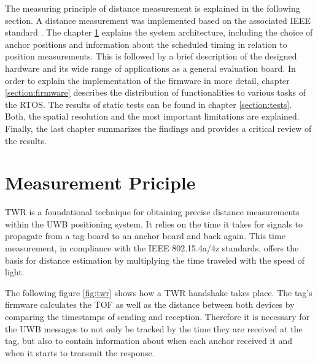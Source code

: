\documentclass[conference, a4paper]{IEEEtran}
\begin{document}
The measuring principle of distance measurement is explained in the following section.
A distance measurement was implemented based on the associated IEEE standard  \cite{IEEE802154a} \cite{IEEE802154z}.
The chapter \ref{Section:principle} explains the system architecture,
including the choice of anchor positions and 
information about the scheduled timing in relation to position measurements.
This is followed by a brief description of the designed hardware and
its wide range of applications as a general evaluation board.
In order to explain the implementation of the firmware in more detail,
chapter \ref{section:firmware} describes the distribution of functionalities to various tasks of the \ac{RTOS}.
The results of static tests can be found in chapter \ref{section:tests}.
Both, the spatial resolution and the most important limitations are explained.
Finally, the last chapter summarizes the findings and provides a critical review of the results.



\section{Measurement Priciple}\label{Section:principle}
\acf{TWR} is a foundational technique for obtaining precise distance measurements within the \ac{UWB} positioning system.
It relies on the time it takes for signals to propagate from a tag board to an anchor board and back again.
This time measurement, in compliance with the IEEE 802.15.4a/4z standards\cite{IEEE802154a}\cite{IEEE802154z}, offers the basis for distance estimation by multiplying the time traveled with the speed of light.

The following figure \ref{fig:twr} shows how a \ac{TWR} handshake takes place.
The tag's firmware calculates the \acf{TOF} as well as the distance between both devices by comparing the timestamps of sending and reception. 
Therefore it is necessary for the \ac{UWB} messages to not only be tracked by the time they are received at the tag, but also to contain information about when each anchor received it and when it starts to transmit the response. 
\end{document}
